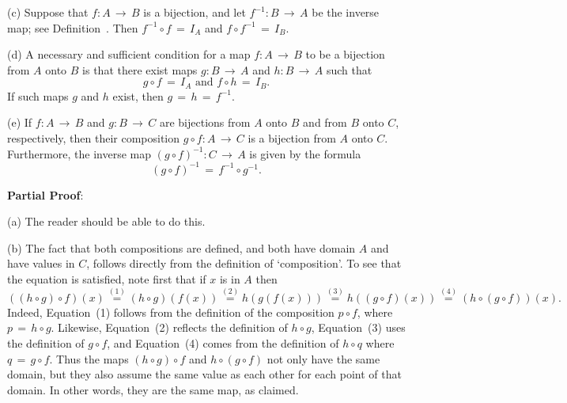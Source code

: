 \V

        (c) Suppose that $f:A \,{\rightarrow}\, B$ is a bijection, and let $f^{-1}:B \,{\rightarrow}\, A$ be the inverse map; see Definition~.
    Then $f^{-1}{\circ}f \,=\, I_{A}$ and $f{\circ}f^{-1} \,=\, I_{B}$.

\V

        (d) A necessary and sufficient condition for a map $f:A \,{\rightarrow}\, B$ to be a bijection from $A$ onto $B$ is that there exist maps $g:B \,{\rightarrow}\, A$ and $h:B \,{\rightarrow}\, A$ such that
        \begin{displaymath}
        g{\circ}f \,=\, I_{A} \mbox{ and } f{\circ}h \,=\, I_{B}.
        \end{displaymath}
    If such maps $g$ and $h$ exist, then $g \,=\, h \,=\, f^{-1}$.

\V

        (e) If $f:A \,{\rightarrow}\, B$ and $g:B \,{\rightarrow}\, C$ are bijections from $A$ onto $B$ and from $B$ onto $C$, respectively,
    then their composition $g{\circ}f:A \,{\rightarrow}\, C$ is a bijection from $A$ onto $C$.
    Furthermore, the inverse map $(g{\circ}f)^{-1}:C \,{\rightarrow}\, A$ is given by the formula
        \begin{displaymath}
        (g{\circ}f)^{-1} \,=\, f^{-1}{\circ}g^{-1}.
        \end{displaymath}


\V
\V

        {\bf Partial Proof}:

    (a) The reader should be able to do this.

\V

        (b) The fact that both compositions are defined, and both have domain $A$ and have values in $C$,
    follows directly from the definition of `composition'.
    To see that the equation is satisfied, note first that if $x$ is in $A$ then
        \begin{displaymath}
        ((h{\circ}g){\circ}f)(x) \stackrel{(1)}{ \,=\, } (h{\circ}g)(f(x)) \stackrel{(2)}{ \,=\, } 
    h(g(f(x)))  \stackrel{(3)}{ \,=\, } h((g{\circ}f)(x))
     \stackrel{(4)}{ \,=\, } (h{\circ}(g{\circ}f))(x).
        \end{displaymath}
    Indeed, Equation~(1) follows from the definition of the composition $p{\circ}f$, where $p \,=\, h{\circ}g$.
    Likewise, Equation~(2) reflects the definition of $h{\circ}g$, Equation~(3) uses the definition of $g{\circ}f$, and Equation~(4) comes from the definition of $h{\circ}q$ where $q \,=\, g{\circ}f$.
    Thus the maps $(h{\circ}g){\circ}f$ and $h{\circ}(g{\circ}f)$ not only have the same domain, but they also assume the same value as each other for each point of that domain.
    In other words, they are the same map, as claimed.


